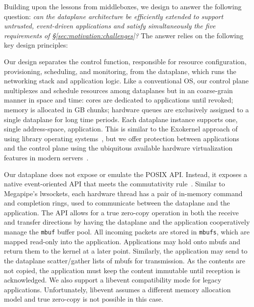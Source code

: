 
Building upon the lessons from middleboxes, we design \ix to answer
the following question: {\it can the dataplane architecture be
  efficiently extended to support untrusted, event-driven applications
  and satisfy simultaneously the five requirements of
  \S\ref{sec:motivation:challenges}?}  The answer relies on the
following key design principles:


Our design separates the control function, responsible for resource
configuration, provisioning, scheduling, and monitoring, from the
dataplane, which runs the networking stack and application logic.
Like a conventional OS, our control plane multiplexes and schedule
resources among dataplanes but in an coarse-grain manner in space and
time: cores are dedicated to applications until revoked; memory is
allocated in GB chunks; hardware queues are exclusively assigned to a
single dataplane for long time periods. Each dataplane instance
supports one, single address-space, application.  This is similar to
the Exokernel approach of using library operating
systems~\cite{DBLP:conf/sosp/EnglerKO95}, but we offer protection
between applications and the control plane using the ubiquitous
available hardware virtualization features in modern
servers~\cite{DBLP:journals/computer/UhligNRSMABKLS05,belay2012dune}.

 Our dataplane does not
expose or emulate the POSIX API.  Instead, it exposes a native
event-oriented API that meets the commutativity
rule~\cite{DBLP:conf/sosp/ClementsKZMK13}. Similar to Megapipe's
lwsockets, each hardware thread has a pair of in-memory command and
completion rings, used to communicate between the dataplane and the
application. The API allows for a true zero-copy operation in both the
receive and transfer directions by having the dataplane and the
application cooperatively manage the \texttt{mbuf} buffer pool.  All
incoming packets are stored in \texttt{mbufs}, which are mapped
read-only into the application. Applications may hold onto mbufs and
return them to the kernel at a later point.  Similarly, the
application may send to the dataplane scatter/gather lists of mbufs
for transmission. As the contents are not copied, the application must
keep the content immutable until reception is acknowledged.  We also
support a libevent compatibility mode for legacy
applications. Unfortunately, libevent assumes a different memory
allocation model and true zero-copy is not possible in this case.


